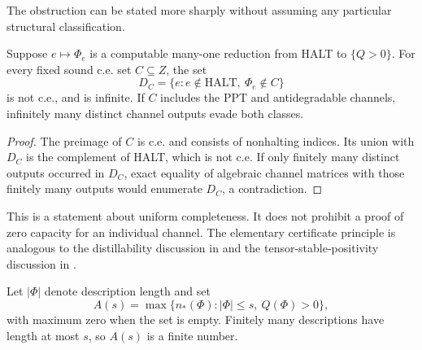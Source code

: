 The obstruction can be stated more sharply without assuming any
particular structural classification.
\begin{proposition}\label{prop:escape}
Suppose $e\mapsto\Phi_e$ is a computable many-one reduction from HALT to
$\{Q>0\}$. For every fixed sound c.e. set $C\subseteq Z$, the set
\[
 D_C=\{e:e\notin\mathrm{HALT},\ \Phi_e\notin C\}
\]
is not c.e., and is infinite. If $C$ includes the PPT and antidegradable
channels, infinitely many distinct channel outputs evade both classes.
\end{proposition}
\begin{proof}
The preimage of $C$ is c.e. and consists of nonhalting indices. Its union
with $D_C$ is the complement of HALT, which is not c.e. If only finitely
many distinct outputs occurred in $D_C$, exact equality of algebraic
channel matrices with those finitely many outputs would enumerate $D_C$,
a contradiction.
\end{proof}
This is a statement about uniform completeness. It does not prohibit a
proof of zero capacity for an individual channel. The elementary
certificate principle is analogous to the distillability discussion in
\cite[Section~3.1]{WCPG} and the tensor-stable-positivity discussion in
\cite[Section~4]{VNC}.

Let $|\Phi|$ denote description length and set
\[
 A(s)=\max\{n_*(\Phi):|\Phi|\leq s,\ Q(\Phi)>0\},
\]
with maximum zero when the set is empty. Finitely many descriptions have
length at most $s$, so $A(s)$ is a finite number.

